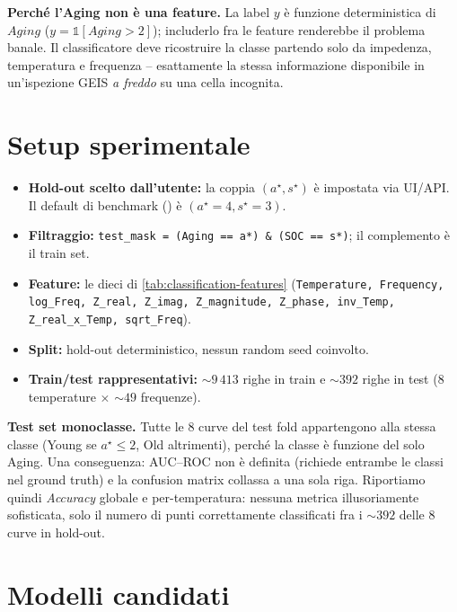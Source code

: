 \textbf{Perché l'Aging non è una feature.} La label $y$ è funzione
deterministica di $Aging$ ($y = \mathbb{1}[Aging > 2]$); includerlo
fra le feature renderebbe il problema banale. Il classificatore deve
ricostruire la classe partendo solo da impedenza, temperatura e frequenza
-- esattamente la stessa informazione disponibile in un'ispezione GEIS
\emph{a freddo} su una cella incognita.

\section{Setup sperimentale}

\begin{itemize}
  \item \textbf{Hold-out scelto dall'utente:} la coppia $(a^\star,
        s^\star)$ è impostata via UI/API. Il default di benchmark
        () è $(a^\star = 4, s^\star = 3)$.
  \item \textbf{Filtraggio:} \texttt{test\_mask = (Aging == a*) \&{} (SOC ==
        s*)}; il complemento è il train set.
  \item \textbf{Feature:} le dieci di \cref{tab:classification-features}
        (\texttt{Temperature, Frequency, log\_Freq, Z\_real, Z\_imag,
        Z\_magnitude, Z\_phase, inv\_Temp, Z\_real\_x\_Temp, sqrt\_Freq}).
  \item \textbf{Split:} hold-out deterministico, nessun random seed
        coinvolto.
  \item \textbf{Train/test rappresentativi:} ${\sim}9\,413$ righe in
        train e ${\sim}392$ righe in test (8 temperature
        $\times$ ${\sim}49$ frequenze).
\end{itemize}

\textbf{Test set monoclasse.} Tutte le 8 curve del test fold
appartengono alla stessa classe (Young se $a^\star \leq 2$, Old
altrimenti), perché la classe è funzione del solo Aging. Una
conseguenza: AUC--ROC non è definita (richiede entrambe le classi nel
ground truth) e la confusion matrix collassa a una sola riga. Riportiamo
quindi \emph{Accuracy} globale e per-temperatura: nessuna metrica
illusoriamente sofisticata, solo il numero di punti correttamente
classificati fra i ${\sim}392$ delle 8 curve in hold-out.

\section{Modelli candidati}

